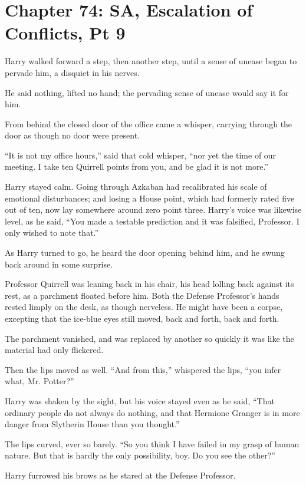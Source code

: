\chapter{Chapter 74: SA, Escalation of Conflicts, Pt 9}
Harry walked forward a step, then another step, until a sense of unease began to pervade him, a disquiet in his nerves.

He said nothing, lifted no hand; the pervading sense of unease would say it for him.

From behind the closed door of the office came a whisper, carrying through the door as though no door were present.

``It is not my office hours,'' said that cold whisper, ``nor yet the time of our meeting. I take ten Quirrell points from you, and be glad it is not more.''

Harry stayed calm. Going through Azkaban had recalibrated his scale of emotional disturbances; and losing a House point, which had formerly rated five out of ten, now lay somewhere around zero point three. Harry's voice was likewise level, as he said, ``You made a testable prediction and it was falsified, Professor. I only wished to note that.''

As Harry turned to go, he heard the door opening behind him, and he swung back around in some surprise.

Professor Quirrell was leaning back in his chair, his head lolling back against its rest, as a parchment floated before him. Both the Defense Professor's hands rested limply on the desk, as though nerveless. He might have been a corpse, excepting that the ice-blue eyes still moved, back and forth, back and forth.

The parchment vanished, and was replaced by another so quickly it was like the material had only flickered.

Then the lips moved as well. ``And from this,'' whispered the lips, ``you infer what, Mr. Potter?''

Harry was shaken by the sight, but his voice stayed even as he said, ``That ordinary people do not always do nothing, and that Hermione Granger is in more danger from Slytherin House than you thought.''

The lips curved, ever so barely. ``So you think I have failed in my grasp of human nature. But that is hardly the only possibility, boy. Do you see the other?''

Harry furrowed his brows as he stared at the Defense Professor.

